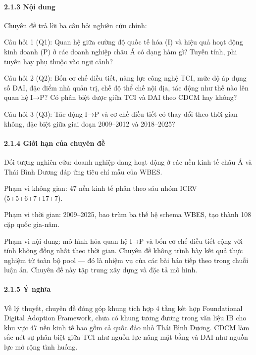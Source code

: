 \documentclass[12pt,a4paper]{article}
\begin{document}
\hypertarget{213-nux1ed9i-dung}{%
\paragraph{2.1.3 Nội dung}\label{213-nux1ed9i-dung}}

Chuyên đề trả lời ba câu hỏi nghiên cứu chính:

Câu hỏi 1 (Q1): Quan hệ giữa cường độ quốc tế hóa (I) và hiệu quả hoạt
động kinh doanh (P) ở các doanh nghiệp châu Á có dạng hàm gì? Tuyến
tính, phi tuyến hay phụ thuộc vào ngữ cảnh?

Câu hỏi 2 (Q2): Bốn cơ chế điều tiết, năng lực công nghệ TCI, mức độ áp
dụng số DAI, đặc điểm nhà quản trị, chế độ thể chế nội địa, tác động như
thế nào lên quan hệ I→P? Có phân biệt được giữa TCI và DAI theo CDCM hay
không?

Câu hỏi 3 (Q3): Tác động I→P và cơ chế điều tiết có thay đổi theo thời
gian không, đặc biệt giữa giai đoạn 2009--2012 và 2018--2025?

\hypertarget{214-giux1edbi-hux1ea1n-cux1ee7a-chuyuxean-ux111ux1ec1}{%
\paragraph{2.1.4 Giới hạn của chuyên
đề}\label{214-giux1edbi-hux1ea1n-cux1ee7a-chuyuxean-ux111ux1ec1}}

Đối tượng nghiên cứu: doanh nghiệp đang hoạt động ở các nền kinh tế châu
Á và Thái Bình Dương đáp ứng tiêu chí mẫu của WBES.

Phạm vi không gian: 47 nền kinh tế phân theo sáu nhóm ICRV
(5+5+6+7+17+7).

Phạm vi thời gian: 2009--2025, bao trùm ba thế hệ schema WBES, tạo thành
108 cặp quốc gia-năm.

Phạm vi nội dung: mô hình hóa quan hệ I→P và bốn cơ chế điều tiết cộng
với tính không đồng nhất theo thời gian. Chuyên đề không trình bày kết
quả thực nghiệm từ toàn bộ pool --- đó là nhiệm vụ của các bài báo tiếp
theo trong chuỗi luận án. Chuyên đề này tập trung xây dựng và đặc tả mô
hình.

\hypertarget{215-uxfd-nghux129a}{%
\paragraph{2.1.5 Ý nghĩa}\label{215-uxfd-nghux129a}}

Về lý thuyết, chuyên đề đóng góp khung tích hợp 4 tầng kết hợp
Foundational Digital Adoption Framework, chưa có khung tương đương trong
văn liệu IB cho khu vực 47 nền kinh tế bao gồm cả quốc đảo nhỏ Thái Bình
Dương. CDCM làm sắc nét sự phân biệt giữa TCI như nguồn lực nâng mặt
bằng và DAI như nguồn lực mở rộng tình huống.
\end{document}
